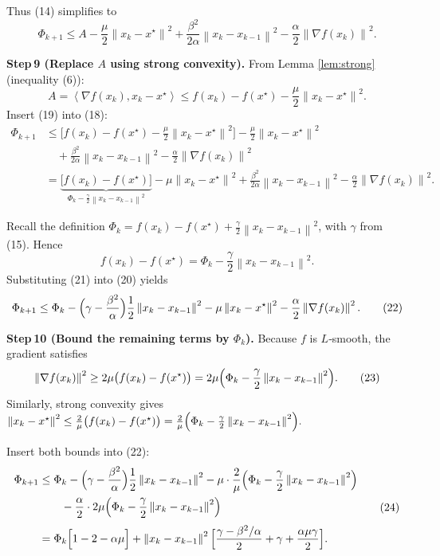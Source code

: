 \documentclass{article}
\newcommand{\norm}[1]{\left\lVert#1\right\rVert}
\newcommand{\inner}[2]{\left\langle #1,#2\right\rangle}
\begin{document}
Thus (14) simplifies to
\[
\Phi_{k+1}\le A-\frac{\mu}{2}\norm{x_k-x^\star}^{2}
           +\frac{\beta^{2}}{2\alpha}\norm{x_k-x_{k-1}}^{2}
           -\frac{\alpha}{2}\norm{\nabla f(x_k)}^{2}.
\tag{18}
\]

\bigskip
\noindent\textbf{Step 9 (Replace $A$ using strong convexity).}  
From Lemma \ref{lem:strong} (inequality (6)):
\[
A=\inner{\nabla f(x_k)}{x_k-x^\star}
\le f(x_k)-f(x^\star)-\frac{\mu}{2}\norm{x_k-x^\star}^{2}.
\tag{19}
\]
Insert (19) into (18):
\[
\begin{aligned}
\Phi_{k+1}
&\le \bigl[f(x_k)-f(x^\star)-\tfrac{\mu}{2}\norm{x_k-x^\star}^{2}\bigr]
   -\frac{\mu}{2}\norm{x_k-x^\star}^{2}\\
&\quad +\frac{\beta^{2}}{2\alpha}\norm{x_k-x_{k-1}}^{2}
   -\frac{\alpha}{2}\norm{\nabla f(x_k)}^{2}\\[1mm]
&= \underbrace{\bigl[f(x_k)-f(x^\star)\bigr]}_{\Phi_k-\frac{\gamma}{2}\norm{x_k-x_{k-1}}^{2}}
   -\mu \norm{x_k-x^\star}^{2}
   +\frac{\beta^{2}}{2\alpha}\norm{x_k-x_{k-1}}^{2}
   -\frac{\alpha}{2}\norm{\nabla f(x_k)}^{2}.
\end{aligned}
\tag{20}
\]

Recall the definition $\Phi_k = f(x_k)-f(x^\star)+\frac{\gamma}{2}\norm{x_k-x_{k-1}}^{2}$, with $\gamma$ from (15). Hence
\[
f(x_k)-f(x^\star)=\Phi_k-\frac{\gamma}{2}\norm{x_k-x_{k-1}}^{2}.
\tag{21}
\]
Substituting (21) into (20) yields
\[
\Phi_{k+1}\le \Phi_k
   -\Bigl(\gamma-\frac{\beta^{2}}{\alpha}\Bigr)\frac{1}{2}\norm{x_k-x_{k-1}}^{2}
   -\mu \norm{x_k-x^\star}^{2}
   -\frac{\alpha}{2}\norm{\nabla f(x_k)}^{2}.
\tag{22}
\]

\bigskip
\noindent\textbf{Step 10 (Bound the remaining terms by $\Phi_k$).}  
Because $f$ is $L$‑smooth, the gradient satisfies
\[
\norm{\nabla f(x_k)}^{2}\ge 2\mu\bigl(f(x_k)-f(x^\star)\bigr)
=2\mu\Bigl(\Phi_k-\frac{\gamma}{2}\norm{x_k-x_{k-1}}^{2}\Bigr).
\tag{23}
\]
Similarly, strong convexity gives $\norm{x_k-x^\star}^{2}\le \tfrac{2}{\mu}\bigl(f(x_k)-f(x^\star)\bigr)=\tfrac{2}{\mu}\Bigl(\Phi_k-\frac{\gamma}{2}\norm{x_k-x_{k-1}}^{2}\Bigr).$

Insert both bounds into (22):
\[
\begin{aligned}
\Phi_{k+1}
&\le \Phi_k
   -\Bigl(\gamma-\frac{\beta^{2}}{\alpha}\Bigr)\frac{1}{2}\norm{x_k-x_{k-1}}^{2}
   -\mu\cdot \frac{2}{\mu}\Bigl(\Phi_k-\frac{\gamma}{2}\norm{x_k-x_{k-1}}^{2}\Bigr)\\
&\qquad -\frac{\alpha}{2}\cdot 2\mu\Bigl(\Phi_k-\frac{\gamma}{2}\norm{x_k-x_{k-1}}^{2}\Bigr)\\[1mm]
&= \Phi_k\Bigl[1-2- \alpha\mu\Bigr]
   +\norm{x_k-x_{k-1}}^{2}\Bigl[\frac{\gamma-\beta^{2}/\alpha}{2}
                               +\gamma +\frac{\alpha\mu\gamma}{2}\Bigr].
\end{aligned}
\tag{24}
\]
\end{document}
